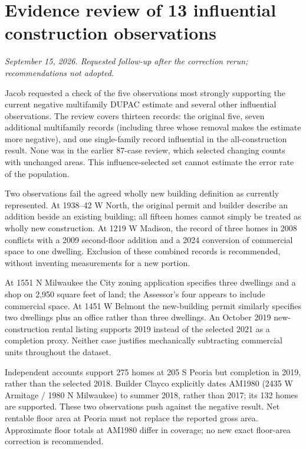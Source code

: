 \clearpage
\section*{Evidence review of 13 influential construction observations}
\textit{September 15, 2026. Requested follow-up after the correction rerun; recommendations not adopted.}

Jacob requested a check of the five observations most strongly supporting
the current negative multifamily DUPAC estimate and several other influential
observations. The review covers thirteen records: the original five, seven
additional multifamily records (including three whose removal makes the
estimate more negative), and one single-family record influential in the
all-construction result. None was in the earlier 87-case review, which
selected changing counts with unchanged areas. This influence-selected set
cannot estimate the error rate of the population.

Two observations fail the agreed wholly new building definition as currently
represented. At 1938--42 W North, the original permit and builder describe
an addition beside an existing building; all fifteen homes cannot simply
be treated as wholly new construction. At 1219 W Madison, the record of
three homes in 2008 conflicts with a 2009 second-floor addition and a 2024
conversion of commercial space to one dwelling. Exclusion of these combined
records is recommended, without inventing measurements for a new portion.

At 1551 N Milwaukee the City zoning application specifies three dwellings
and a shop on 2,950 square feet of land; the Assessor's four appears to
include commercial space. At 1451 W Belmont the new-building permit similarly
specifies two dwellings plus an office rather than three dwellings. An
October 2019 new-construction rental listing supports 2019 instead of the
selected 2021 as a completion proxy. Neither case justifies mechanically
subtracting commercial units throughout the dataset.

Independent accounts support 275 homes at 205 S Peoria but completion in
2019, rather than the selected 2018. Builder Clayco explicitly dates
AM1980 (2435 W Armitage / 1980 N Milwaukee) to summer 2018, rather than
2017; its 132 homes are supported. These two observations push against
the negative result. Net rentable floor area at Peoria must not replace
the reported gross area. Approximate floor totals at AM1980 differ in
coverage; no new exact floor-area correction is recommended.

